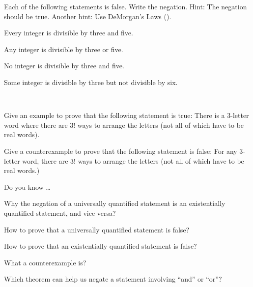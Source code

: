 \begin{exer}[\exerU] %
\label{exer_neg_numberthy}
    Each of the following statements is false.  Write the negation. Hint: The negation should be true. Another hint: Use DeMorgan's Laws ().
        \begin{exerpart} 
            \item Every integer is divisible by three and five.
            \item Any integer is divisible by three or five.
            \item No integer is divisible by three and five.  
            \item Some integer is divisible by three but not divisible by six.
        \end{exerpart}
\end{exer}
            
\begin{exer}[\exerU] %
\label{exer_rearrange_3letter_word}
~
    \begin{exerpart}
        \item Give an example to prove that the following statement is true:  There is a 3-letter word where there are 3! ways to arrange the letters (not all of which have to be real words).
        \item Give a counterexample to prove that the following statement is false: For any 3-letter word, there are 3! ways to arrange the letters (not all of which have to be real words.)      
    \end{exerpart}
\end{exer}

\begin{exer}[\exerR] %
\label{exer_dyk_cex}
    Do you know \ldots
        \begin{exerpart}
            \item Why the negation of a universally quantified statement is an existentially quantified statement, and vice versa?
            \item How to prove that a universally quantified statement is false?
            \item How to prove that an existentially quantified statement is false?
            \item What a counterexample is?
           \item Which theorem can help us negate a statement involving ``and'' or ``or''? 
        \end{exerpart}
\end{exer}

